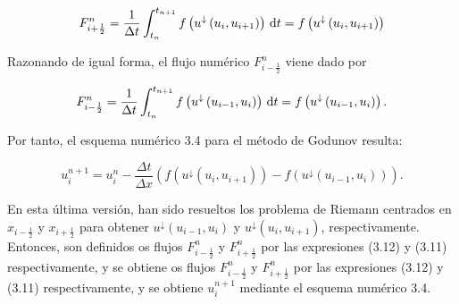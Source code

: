 \begin{equation*}
    F^{n}_{i+\frac{1}{2}}=
    \frac{1}{\Delta t}
    \int_{t_{n}}^{t_{n+1}}
    f\left(u^{\downarrow}\left(u_{i},u_{i+1}\right)\right)\dl t=
    f\left(u^{\downarrow}\left(u_{i},u_{i+1}\right)\right)
\end{equation*}

Razonando de igual forma, el flujo numérico $F^{n}_{i-\frac{1}{2}}$ viene dado por

\begin{equation*}
    F_{i-\frac{1}{2}}^{n}=
    \frac{1}{\Delta t}
    \int_{t_{n}}^{t_{n+1}}
    f\left(u^{\downarrow}\left(u_{i-1},u_{i}\right)\right)\dl t=
    f\left(u^{\downarrow}\left(u_{i-1},u_{i}\right)\right).
\end{equation*}

Por tanto, el esquema numérico 3.4 para el método de Godunov resulta:

\begin{equation*}
    u^{n+1}_{i}=
    u^{n}_{i}-
    \frac{\Delta t}{\Delta x}
    \left(
    f\left(u^{\downarrow}\left(u_{i},u_{i+1}\right)\right)-
    f\left(u^{\downarrow}\left(u_{i-1},u_{i}\right)\right)
    \right).
\end{equation*}

En esta última versión, han sido resueltos los problema de Riemann
centrados en $x_{i-\frac{1}{2}}$ y $x_{i+\frac{1}{2}}$ para obtener
$u^{\downarrow}\left(u_{i-1},u_{i}\right)$ y
$u^{\downarrow}\left(u_{i},u_{i+1}\right)$, respectivamente.
Entonces, son definidos os flujos $F^{n}_{i-\frac{1}{2}}$ y
$F^{n}_{i+\frac{1}{2}}$ por las expresiones (3.12) y (3.11) respectivamente,
y se obtiene os flujos $F^{n}_{i-\frac{1}{2}}$ y $F^{n}_{i+\frac{1}{2}}$
por las expresiones (3.12) y (3.11) respectivamente, y se obtiene
$u^{n+1}_{i}$ mediante el esquema numérico 3.4.